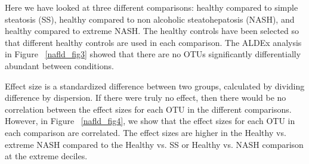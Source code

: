 \FloatBarrier
Here we have looked at three different comparisons: healthy compared to simple steatosis (SS), healthy compared to non alcoholic steatohepatosis (NASH), and healthy compared to extreme NASH. The healthy controls have been selected so that different healthy controls are used in each comparison. The ALDEx analysis in Figure ~\ref{nafld_fig3} showed that there are no OTUs significantly differentially abundant between conditions.

Effect size is a standardized difference between two groups, calculated by dividing difference by dispersion. If there were truly no effect, then there would be no correlation between the effect sizes for each OTU in the different comparisons. However, in Figure ~\ref{nafld_fig4}, we show that the effect sizes for each OTU in each comparison are correlated. The effect sizes are higher in the Healthy vs. extreme NASH compared to the Healthy vs. SS or Healthy vs. NASH comparison at the extreme deciles.

